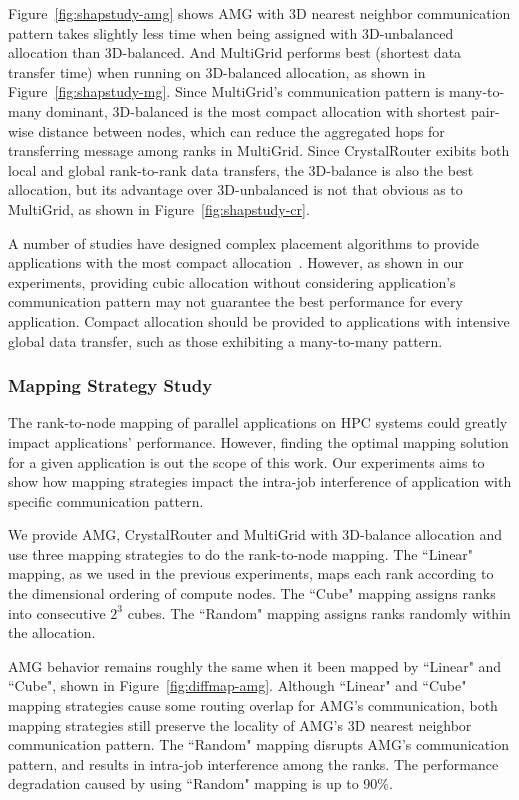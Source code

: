 Figure~\ref{fig:shapstudy-amg} shows 
AMG with 3D nearest neighbor communication pattern takes slightly less time 
when being assigned with 3D-unbalanced allocation than 3D-balanced. 
And MultiGrid performs best (shortest data transfer time) 
when running on 3D-balanced allocation, as shown in Figure~\ref{fig:shapstudy-mg}. 
Since MultiGrid's communication pattern is many-to-many dominant, 
3D-balanced is the most compact allocation with shortest pair-wise distance between nodes, 
which can reduce the aggregated hops for transferring message among ranks in MultiGrid. 
Since CrystalRouter exibits both local and global rank-to-rank data transfers, 
the 3D-balance is also the best allocation, but its advantage over 3D-unbalanced is not 
that obvious as to MultiGrid, as shown in Figure~\ref{fig:shapstudy-cr}.



A number of studies have designed complex placement algorithms 
to provide applications with the most compact allocation~\cite{leung,LO}. 
However, as shown in our experiments, providing cubic allocation without 
considering application's communication pattern may not guarantee 
the best performance for every application. 
Compact allocation should be provided to applications with intensive global data transfer, 
such as those exhibiting a many-to-many pattern. 






\subsubsection{Mapping Strategy Study}
The rank-to-node mapping of parallel applications on HPC systems 
could greatly impact applications' performance. 
However, finding the optimal mapping solution for a given 
application is out the scope of this work. 
Our experiments aims to show how mapping strategies impact the 
intra-job interference of application with specific communication pattern.

We provide AMG, CrystalRouter and MultiGrid with 3D-balance allocation and 
use three mapping strategies to do the rank-to-node mapping. 
The ``Linear" mapping, as we used in the previous experiments, 
maps each rank according to the dimensional ordering of compute nodes. 
The ``Cube" mapping assigns ranks into consecutive $2^{3}$ cubes. 
The ``Random" mapping assigns ranks randomly within the allocation. 

AMG behavior remains roughly the same when it been mapped by ``Linear" and ``Cube", 
shown in Figure~\ref{fig:diffmap-amg}. 
Although ``Linear" and ``Cube" mapping strategies cause some routing overlap for AMG's communication, 
both mapping strategies still preserve the locality of AMG's 3D nearest neighbor communication pattern. 
The ``Random" mapping disrupts AMG's communication pattern, 
and results in intra-job interference among the ranks. 
The performance degradation caused by using ``Random" mapping is up to 90\%.

